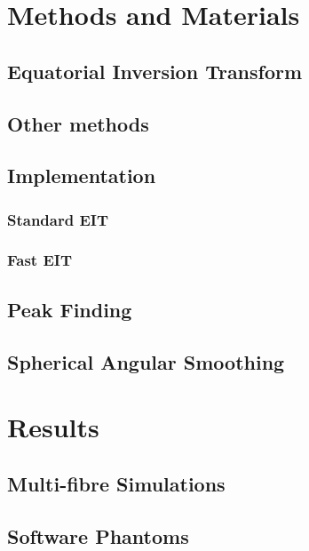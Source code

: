 \documentclass{bioinfo}
\begin{document}
\begin{methods}

\section{Methods and Materials}

\subsection{Equatorial Inversion Transform}

\subsection{Other methods}

\subsection{Implementation }

\subsubsection{Standard EIT\label{sub:Standard-EIT}}

\subsubsection{Fast EIT}

\subsection{Peak Finding\label{sub:Peak-Finding}}

\subsection{Spherical Angular Smoothing\label{sub:Spherical-Angular-Smoothing}}

\section{Results}

\subsection{Multi-fibre Simulations\label{sub:Multi-fiber-Simulations}}

\subsection{Software Phantoms\label{sub:Digital-Phantoms}}


\end{methods}
\end{document}

